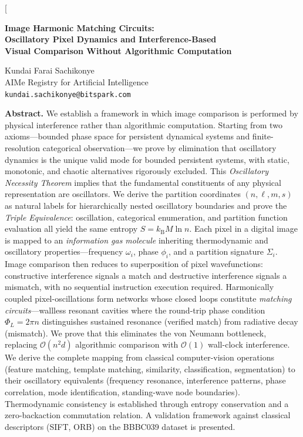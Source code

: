 \documentclass[11pt,twocolumn,a4paper]{article}
\newcommand{\kb}{k_{\mathrm{B}}}
\newcommand{\BigO}{\mathcal{O}}
\begin{document}
\twocolumn[
\begin{@twocolumnfalse}
\begin{center}

{\LARGE\bfseries Image Harmonic Matching Circuits:\\[4pt]
Oscillatory Pixel Dynamics and Interference-Based\\[4pt]
Visual Comparison Without Algorithmic Computation}

\vspace{12pt}

{\large Kundai Farai Sachikonye\\
AIMe Registry for Artificial Intelligence\\
\texttt{kundai.sachikonye@bitspark.com}}

\vspace{14pt}

\begin{minipage}{0.92\textwidth}
\textbf{Abstract.}
We establish a framework in which image comparison is performed by physical interference rather than algorithmic computation. Starting from two axioms---bounded phase space for persistent dynamical systems and finite-resolution categorical observation---we prove by elimination that oscillatory dynamics is the unique valid mode for bounded persistent systems, with static, monotonic, and chaotic alternatives rigorously excluded. This \emph{Oscillatory Necessity Theorem} implies that the fundamental constituents of any physical representation are oscillators. We derive the partition coordinates $(n, \ell, m, s)$ as natural labels for hierarchically nested oscillatory boundaries and prove the \emph{Triple Equivalence}: oscillation, categorical enumeration, and partition function evaluation all yield the same entropy $S = \kb M \ln n$. Each pixel in a digital image is mapped to an \emph{information gas molecule} inheriting thermodynamic and oscillatory properties---frequency $\omega_i$, phase $\phi_i$, and a partition signature $\Sigma_i$. Image comparison then reduces to superposition of pixel wavefunctions: constructive interference signals a match and destructive interference signals a mismatch, with no sequential instruction execution required. Harmonically coupled pixel-oscillations form networks whose closed loops constitute \emph{matching circuits}---wallless resonant cavities where the round-trip phase condition $\Phi_L = 2\pi n$ distinguishes sustained resonance (verified match) from radiative decay (mismatch). We prove that this eliminates the von Neumann bottleneck, replacing $\BigO(n^2 d)$ algorithmic comparison with $\BigO(1)$ wall-clock interference. We derive the complete mapping from classical computer-vision operations (feature matching, template matching, similarity, classification, segmentation) to their oscillatory equivalents (frequency resonance, interference patterns, phase correlation, mode identification, standing-wave node boundaries). Thermodynamic consistency is established through entropy conservation and a zero-backaction commutation relation. A validation framework against classical descriptors (SIFT, ORB) on the BBBC039 dataset is presented.


\end{minipage}
\end{center}
\end{@twocolumnfalse}
\end{document}
